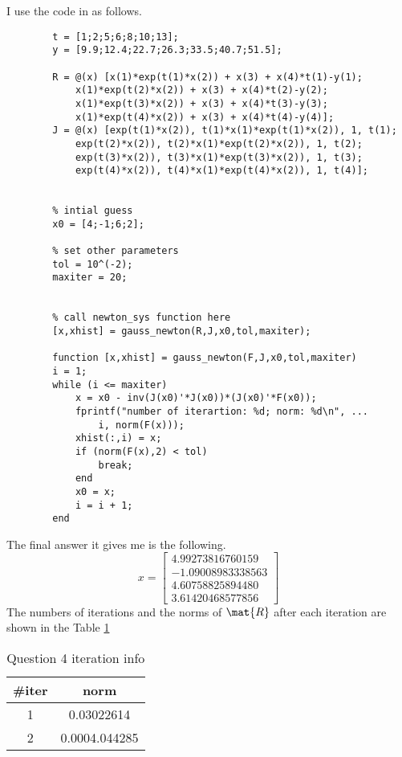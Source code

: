 \begin{answer}
    I use the code in \MATLAB as follows.
    \begin{verbatim}
        t = [1;2;5;6;8;10;13];
        y = [9.9;12.4;22.7;26.3;33.5;40.7;51.5];
        
        R = @(x) [x(1)*exp(t(1)*x(2)) + x(3) + x(4)*t(1)-y(1);
            x(1)*exp(t(2)*x(2)) + x(3) + x(4)*t(2)-y(2);
            x(1)*exp(t(3)*x(2)) + x(3) + x(4)*t(3)-y(3);
            x(1)*exp(t(4)*x(2)) + x(3) + x(4)*t(4)-y(4)];
        J = @(x) [exp(t(1)*x(2)), t(1)*x(1)*exp(t(1)*x(2)), 1, t(1);
            exp(t(2)*x(2)), t(2)*x(1)*exp(t(2)*x(2)), 1, t(2);
            exp(t(3)*x(2)), t(3)*x(1)*exp(t(3)*x(2)), 1, t(3);
            exp(t(4)*x(2)), t(4)*x(1)*exp(t(4)*x(2)), 1, t(4)];
        
        
        % intial guess
        x0 = [4;-1;6;2];
        
        % set other parameters
        tol = 10^(-2);
        maxiter = 20;
        
        
        % call newton_sys function here
        [x,xhist] = gauss_newton(R,J,x0,tol,maxiter);

        function [x,xhist] = gauss_newton(F,J,x0,tol,maxiter)
        i = 1;
        while (i <= maxiter)
            x = x0 - inv(J(x0)'*J(x0))*(J(x0)'*F(x0));
            fprintf("number of iterartion: %d; norm: %d\n", ...
                i, norm(F(x)));
            xhist(:,i) = x;
            if (norm(F(x),2) < tol)
                break;
            end
            x0 = x;
            i = i + 1;
        end
    \end{verbatim}
    The final answer it gives me is the following. 
    \begin{equation}
        x = \left[\begin{matrix}4.99273816760159\\-1.09008983338563\\4.60758825894480\\3.61420468577856\end{matrix}\right]
    \end{equation}
    The numbers of iterations and the norms of $\mat{R}$ after each iteration are shown in the Table \ref{tab:tab1}
    \begin{table}[H]
        \centering
        \caption{Question 4 iteration info}
        \label{tab:tab1}
        \begin{tabular}{|c|c|}
            \hline
            \textbf{\#iter} & \textbf{norm} \\ \hline
            1               & 0.03022614    \\ \hline
            2               & 0.0004.044285 \\ \hline
        \end{tabular}
    \end{table}
\end{answer}